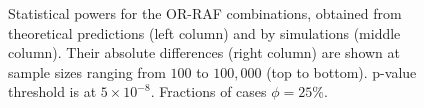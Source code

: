 \begin{figure}[!tpb]
{        }%
\caption{
Statistical powers for the OR-RAF combinations, obtained from theoretical predictions (left column) and by simulations (middle column). Their absolute differences (right column) are shown at sample sizes ranging from $100$ to $100,000$ (top to bottom).
p-value threshold is at $5\times10^{-8}$.
Fractions of cases $\phi=25\%$.
}\label{fig:phi025}
\end{figure}


